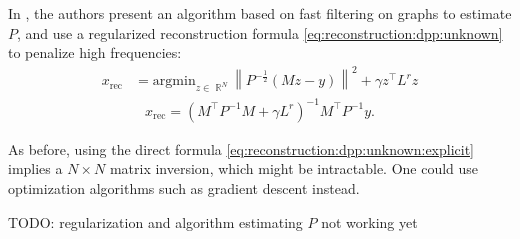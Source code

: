 \documentclass{article}
\newcommand{\norm}[1]{\left\|#1\right\|}
\DeclareMathOperator{\R}{\mathbb{R}}
\begin{document}
In \cite{tremblay2017}, the authors present an algorithm based on fast filtering on graphs to estimate $P$, and use a regularized reconstruction formula \eqref{eq:reconstruction:dpp:unknown} to penalize high frequencies:
\begin{align*}
x_\text{rec} &= \mathrm{argmin}_{z \in \R^N} \norm{P^{-\frac{1}{2}} \left( M z - y \right)}^2 + \gamma z^\top L^r z
\end{align*}
\begin{align} \boxed{x_\text{rec} = (M^\top P^{-1} M + \gamma L^r)^{-1} M^\top P^{-1} y}. \label{eq:reconstruction:dpp:unknown:explicit} \end{align}


As before, using the direct formula \eqref{eq:reconstruction:dpp:unknown:explicit} implies a $N \times N$ matrix inversion, which might be intractable. One could use optimization algorithms such as gradient descent instead.


TODO: regularization and algorithm estimating $P$ not working yet

	
\newpage
 

\end{document}
